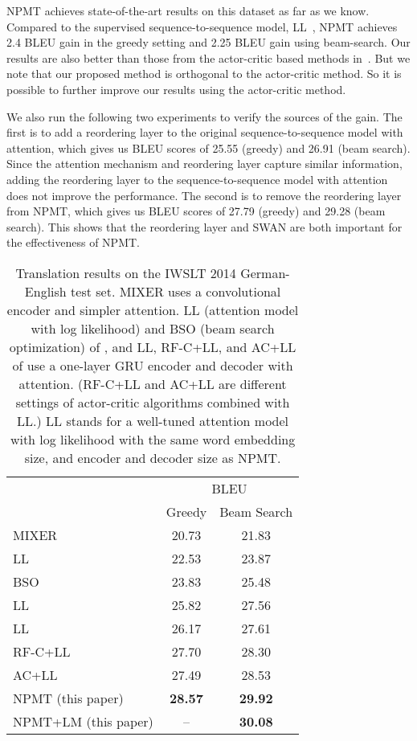 \documentclass{article}
\begin{document}
NPMT achieves state-of-the-art results on this dataset as far as we know.
Compared to the supervised sequence-to-sequence model, LL~\citep{Bahdanau2016},
NPMT achieves 2.4 BLEU gain in the greedy setting and 2.25 BLEU gain using
beam-search. Our results are also better than those from the actor-critic based
methods in~\citet{Bahdanau2016}. But we note that our proposed method is
orthogonal to the actor-critic method. So it is possible to further improve our
results using the actor-critic method. 


We also run the following two experiments to verify the sources of the gain.  The
first is to add a reordering layer to the original sequence-to-sequence model
with attention, which gives us BLEU scores of 25.55 (greedy) and 26.91 (beam
search). 
Since the attention mechanism and reordering layer capture similar information, adding the reordering layer to the sequence-to-sequence model with attention does not improve the performance.
The second is to remove the reordering layer from NPMT, which gives us
BLEU scores of 27.79 (greedy) and 29.28 (beam search). This shows that the
reordering layer and SWAN are both important for the effectiveness of NPMT.






\begin{table}[t!]
	\centering
	\begin{tabular}{lcc}
		\toprule		
		& \multicolumn{2}{c}{BLEU } \\ 
		&  Greedy & Beam Search \\ 	
		\midrule
MIXER \citep{DBLP:journals/corr/RanzatoCAZ15} & 20.73 & 21.83 \\    
		LL \citep{wiseman2016sequence} & 22.53  & 23.87 \\
		BSO \citep{wiseman2016sequence} & {23.83} & {25.48} \\
		LL \citep{Bahdanau2016} & 25.82  & 27.56 \\
		LL & 26.17  & 27.61 \\
\midrule
		RF-C+LL \citep{Bahdanau2016} & {27.70} & {28.30} \\
AC+LL \citep{Bahdanau2016} & {27.49} & {28.53} \\		
		\midrule


		NPMT (this paper) & \textbf{28.57} & \textbf{29.92} \\				
		NPMT+LM (this paper) & {--} & \textbf{30.08} \\				
		\bottomrule
	\end{tabular}
	\caption{\small{Translation results on the IWSLT 2014 German-English test set. MIXER
		\cite{DBLP:journals/corr/RanzatoCAZ15} uses a  convolutional encoder and
		simpler attention. LL (attention model with log likelihood) and BSO (beam
		search optimization) of \citet{wiseman2016sequence}, and LL, RF-C+LL, and
		AC+LL of \citet{Bahdanau2016} use a one-layer GRU encoder and decoder with
    attention. (RF-C+LL and AC+LL are different settings of actor-critic
    algorithms combined with LL.) LL stands for a well-tuned attention
    model with log likelihood with the same word embedding size, and encoder and
    decoder size as NPMT.}
	}
\label{tab:iwslt_de-en}
\end{table}
\end{document}
